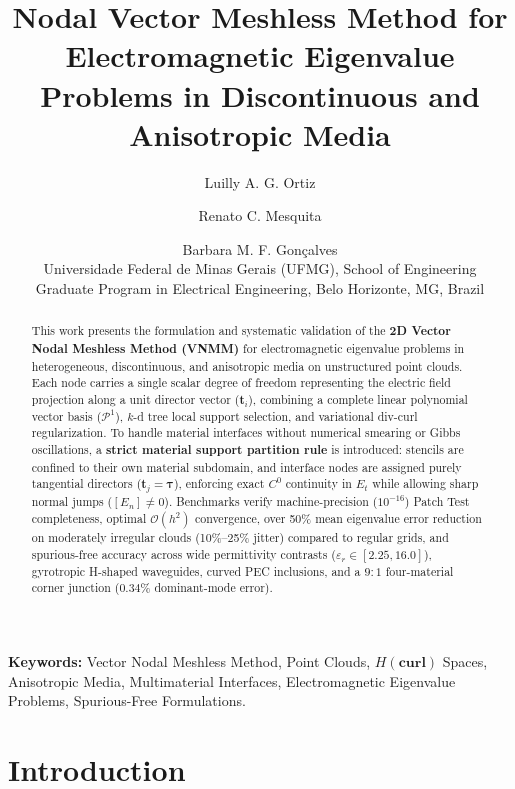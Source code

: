 \documentclass[11pt,a4paper]{article}
\title{\textbf{Nodal Vector Meshless Method for Electromagnetic Eigenvalue Problems in Discontinuous and Anisotropic Media}}
\author{
  Luilly A. G. Ortiz \and Renato C. Mesquita \and Barbara M. F. Gon\c{c}alves \\
  \small Universidade Federal de Minas Gerais (UFMG), School of Engineering \\
  \small Graduate Program in Electrical Engineering, Belo Horizonte, MG, Brazil
}
\date{}
\begin{document}
\maketitle

\begin{abstract}
This work presents the formulation and systematic validation of the \textbf{2D Vector Nodal Meshless Method (VNMM)} for electromagnetic eigenvalue problems in heterogeneous, discontinuous, and anisotropic media on unstructured point clouds. Each node carries a single scalar degree of freedom representing the electric field projection along a unit director vector ($\mathbf{t}_i$), combining a complete linear polynomial vector basis ($\mathcal{P}^1$), $k$-d tree local support selection, and variational div-curl regularization. To handle material interfaces without numerical smearing or Gibbs oscillations, a \textbf{strict material support partition rule} is introduced: stencils are confined to their own material subdomain, and interface nodes are assigned purely tangential directors ($\mathbf{t}_j = \boldsymbol{\tau}$), enforcing exact $C^0$ continuity in $E_t$ while allowing sharp normal jumps ($[E_n] \neq 0$). Benchmarks verify machine-precision ($10^{-16}$) Patch Test completeness, optimal $\mathcal{O}(h^2)$ convergence, over 50\% mean eigenvalue error reduction on moderately irregular clouds (10\%--25\% jitter) compared to regular grids, and spurious-free accuracy across wide permittivity contrasts ($\varepsilon_r \in [2.25, 16.0]$), gyrotropic H-shaped waveguides, curved PEC inclusions, and a $9:1$ four-material corner junction ($0.34\%$ dominant-mode error).
\end{abstract}

\noindent\textbf{Keywords:} Vector Nodal Meshless Method, Point Clouds, $H(\mathbf{curl})$ Spaces, Anisotropic Media, Multimaterial Interfaces, Electromagnetic Eigenvalue Problems, Spurious-Free Formulations.

\section{Introduction}
\end{document}
